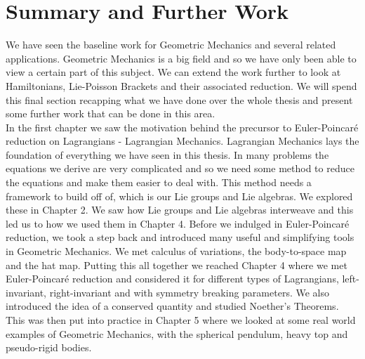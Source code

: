 
\section{Summary and Further Work}

We have seen the baseline work for Geometric Mechanics and several related applications. Geometric Mechanics is a big field and so we have only been able to view a certain part of this subject. We can extend the work further to look at Hamiltonians, Lie-Poisson Brackets and their associated reduction. We will spend this final section recapping what we have done over the whole thesis and present some further work that can be done in this area. \\

\noindent
In the first chapter we saw the motivation behind the precursor to Euler-Poincar\'e reduction on Lagrangians - Lagrangian Mechanics. Lagrangian Mechanics lays the foundation of everything we have seen in this thesis. In many problems the equations we derive are very complicated and so we need some method to reduce the equations and make them easier to deal with. This method needs a framework to build off of, which is our Lie groups and Lie algebras. We explored these in Chapter 2. We saw how Lie groups and Lie algebras interweave and this led us to how we used them in Chapter 4. Before we indulged in Euler-Poincar\'e reduction, we took a step back and introduced many useful and simplifying tools in Geometric Mechanics. We met calculus of variations, the body-to-space map and the hat map. Putting this all together we reached Chapter 4 where we met Euler-Poincar\'e reduction and considered it for different types of Lagrangians, left-invariant, right-invariant and with symmetry breaking parameters. We also introduced the idea of a conserved quantity and studied Noether's Theorems. This was then put into practice in Chapter 5 where we looked at some real world examples of Geometric Mechanics, with the spherical pendulum, heavy top and pseudo-rigid bodies.\\

